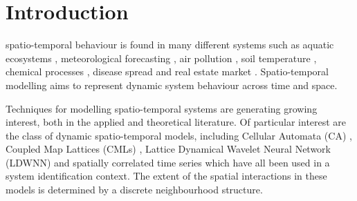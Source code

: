 \documentclass[draftcls,onecolumn]{IEEEtran}
\begin{document}
%
\IEEEpeerreviewmaketitle



\section{Introduction}
% 
% 
% 
% 
 spatio-temporal behaviour is found in many different systems such as aquatic ecosystems \cite{Schofield2002}, meteorological forecasting \cite{Xu2005}, air pollution \cite{Romanowicz2006}, soil temperature  \cite{Bond-Lamberty2005}, chemical processes \cite{Deng2005}, disease spread \cite{Kuo2009} and real estate market \cite{Sun2005}. Spatio-temporal modelling aims to represent dynamic system behaviour across time and space. %

Techniques for modelling spatio-temporal systems are generating growing interest, both in the applied and theoretical literature. Of particular interest are the class of dynamic spatio-temporal models, including Cellular Automata (CA) \cite{Wolfram1994}, Coupled Map Lattices (CMLs) \cite{Billings2002}, Lattice Dynamical Wavelet Neural Network (LDWNN) \cite{Wei2009} and spatially correlated time series  \cite{Pfeifer1980,Glasbey2008,Dewar2007} which have all been used in a system identification context. The extent of the spatial interactions in these models is determined by a discrete neighbourhood structure.
\end{document}
